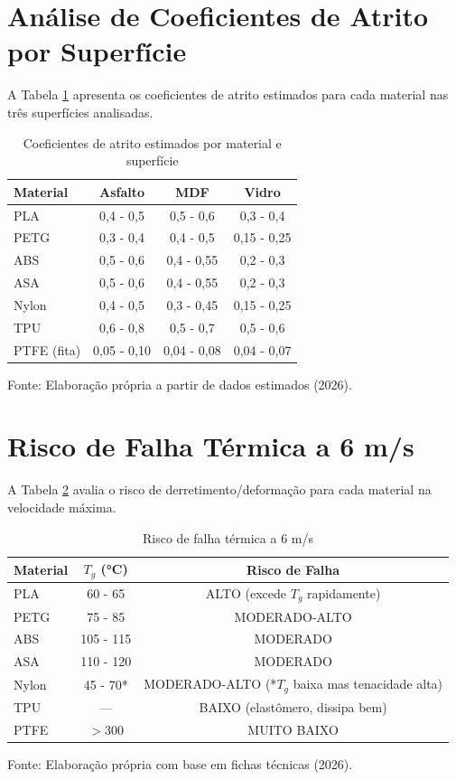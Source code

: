\documentclass[12pt, a4paper]{article}
\newcommand{\fonte}[1]{\vspace{0.2cm}\par\noindent\fontsize{9}{11}\selectfont Fonte: #1}
\begin{document}
\section{Análise de Coeficientes de Atrito por Superfície}

A Tabela \ref{tab:coef_atrito} apresenta os coeficientes de atrito estimados para cada material nas três superfícies analisadas.
\begin{table}[h]
\centering
\caption{Coeficientes de atrito estimados por material e superfície}
\label{tab:coef_atrito}
\begin{tabular}{l|c|c|c}
\hline
\textbf{Material} & \textbf{Asfalto} & \textbf{MDF} & \textbf{Vidro} \\ \hline
PLA & 0,4 - 0,5 & 0,5 - 0,6 & 0,3 - 0,4 \\
PETG & 0,3 - 0,4 & 0,4 - 0,5 & 0,15 - 0,25 \\
ABS & 0,5 - 0,6 & 0,4 - 0,55 & 0,2 - 0,3 \\
ASA & 0,5 - 0,6 & 0,4 - 0,55 & 0,2 - 0,3 \\
Nylon & 0,4 - 0,5 & 0,3 - 0,45 & 0,15 - 0,25 \\
TPU & 0,6 - 0,8 & 0,5 - 0,7 & 0,5 - 0,6 \\
PTFE (fita) & 0,05 - 0,10 & 0,04 - 0,08 & 0,04 - 0,07 \\ \hline
\end{tabular}
\fonte{Elaboração própria a partir de dados estimados (2026).}
\end{table}

\section{Risco de Falha Térmica a 6 m/s}

A Tabela \ref{tab:falha} avalia o risco de derretimento/deformação para cada material na velocidade máxima.
\begin{table}[h]
\centering
\caption{Risco de falha térmica a 6 m/s}
\label{tab:falha}
\begin{tabular}{l|c|c}
\hline
\textbf{Material} & $T_g$ (°C) & \textbf{Risco de Falha} \\ \hline
PLA & 60 - 65 & ALTO (excede $T_g$ rapidamente) \\
PETG & 75 - 85 & MODERADO-ALTO \\
ABS & 105 - 115 & MODERADO \\
ASA & 110 - 120 & MODERADO \\
Nylon & 45 - 70* & MODERADO-ALTO (*$T_g$ baixa mas tenacidade alta) \\
TPU & --- & BAIXO (elastômero, dissipa bem) \\
PTFE & $>$300 & MUITO BAIXO \\ \hline
\end{tabular}
\fonte{Elaboração própria com base em fichas técnicas (2026).}
\end{table}
\end{document}
